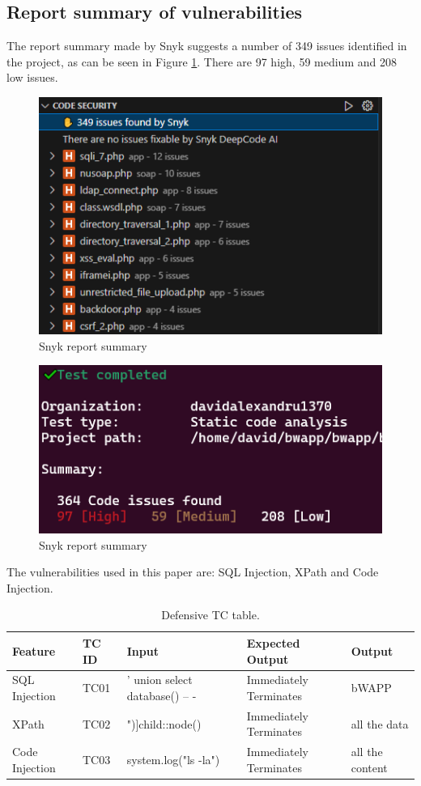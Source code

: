 \documentclass{article}
\begin{document}
\subsection{Report summary of vulnerabilities}
The report summary made by Snyk suggests a number of 349 issues identified in the project, as can be seen in Figure \ref{fig:snyk-report-summary}. There are 97 high, 59 medium and 208 low issues.
\begin{figure}[H]
    \centering
    \includegraphics[width=0.5\linewidth]{Figures/defensive/issues.PNG}
    \caption{Snyk report summary}
    \label{fig:snyk-report-summary}
\end{figure}
\begin{figure}[H]
    \centering
    \includegraphics[width=0.5\linewidth]{Figures/defensive/all-issues.PNG}
    \caption{Snyk report summary}
    \label{fig:snyk-report-summary2}
\end{figure}
\par The vulnerabilities used in this paper are: SQL Injection, XPath and Code Injection.
\begin{table} [H]
    \centering
    \begin{tabular}{l|l|l|l|l}
        Feature & TC ID & Input                  & Expected Output        & Output                 \\ \hline
        SQL Injection    & TC01  & ' union select database() -- -              & Immediately Terminates &  bWAPP \\
        XPath    & TC02  & ")]child::node()    & Immediately Terminates & all the data \\
        Code Injection    & TC03  & system.log("ls -la")    & Immediately Terminates & all the content \\
    \end{tabular}
    \caption{\label{tab:TC-defensive}Defensive TC table.}
\end{table}
\end{document}
